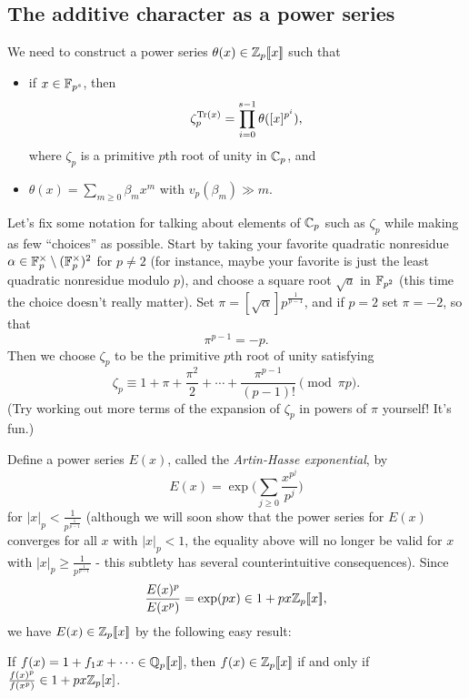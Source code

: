 \subsection{The additive character as a power series}

We need to construct a power series $\theta(x) \in \mathbb{Z}_p[\![x]\!]$ such that
\begin{itemize}
\item if $x \in \mathbb{F}_{p^s}$, then
\[
\zeta_p^{\operatorname{Tr}(x)} = \prod_{i=0}^{s-1} \theta([x]^{p^i}),
\]
where $\zeta_p$ is a primitive $p$th root of unity in $\mathbb{C}_p$, and

\item $\theta(x) = \sum_{m \ge 0} \beta_m x^m$ with $v_p(\beta_m) \gg m$.
\end{itemize}

Let's fix some notation for talking about elements of $\mathbb{C}_p$ such as $\zeta_p$ while making as few ``choices'' as possible. Start by taking your favorite quadratic nonresidue $\alpha \in \mathbb{F}_p^{\times} \setminus (\mathbb{F}_p^{\times})^2$ for $p \ne 2$ (for instance, maybe your favorite is just the least quadratic nonresidue modulo $p$), and choose a square root $\sqrt{a}$ in $\mathbb{F}_{p^2}$ (this time the choice doesn't really matter). Set $\pi = [\sqrt{\alpha}]p^{\frac{1}{p-1}}$, and if $p = 2$ set $\pi = -2$, so that
\[
\pi^{p-1} = -p.
\]
Then we choose $\zeta_p$ to be the primitive $p$th root of unity satisfying
\[
\zeta_p \equiv 1 + \pi + \frac{\pi^2}{2} + \cdots + \frac{\pi^{p-1}}{(p-1)!} \pmod{\pi p}.
\]
(Try working out more terms of the expansion of $\zeta_p$ in powers of $\pi$ yourself! It's fun.)

Define a power series $E(x)$, called the \emph{Artin-Hasse exponential}, by
\[
E(x) = \exp\Big(\sum_{j \ge 0} \frac{x^{p^j}}{p^j}\Big)
\]
for $|x|_p < \frac{1}{p^{\frac{1}{p-1}}}$ (although we will soon show that the power series for $E(x)$ converges for all $x$ with $|x|_p < 1$, the equality above will no longer be valid for $x$ with $|x|_p \ge \frac{1}{p^{\frac{1}{p-1}}}$ - this subtlety has several counterintuitive consequences). Since
\[
\frac{E(x)^p}{E(x^p)} = \exp(px) \in 1 + px\mathbb{Z}_p[\![x]\!],
\]
we have $E(x) \in \mathbb{Z}_p[\![x]\!]$ by the following easy result:

\begin{lem} If $f(x) = 1 + f_1x + \cdots \in \mathbb{Q}_p[\![x]\!]$, then $f(x) \in \mathbb{Z}_p[\![x]\!]$ if and only if $\frac{f(x)^p}{f(x^p)} \in 1 + px\mathbb{Z}_p[x]$.
\end{lem}

